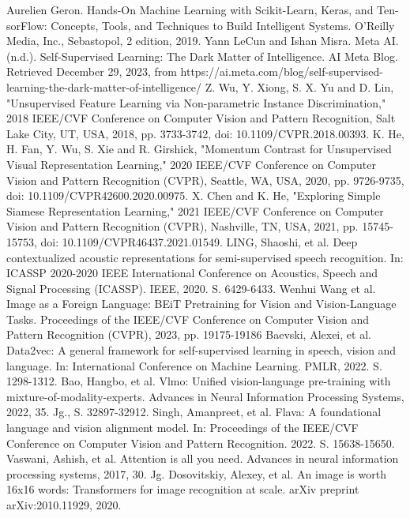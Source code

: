 \documentclass[fontsize=12pt,paper=a4,twoside=semi,parskip=half-,headsepline,headinclude]{scrreprt}
\begin{document}

\begin{thebibliography}{00}
   Aurelien Geron. Hands-On Machine Learning with Scikit-Learn, Keras, and Ten- sorFlow: Concepts, Tools, and Techniques to Build Intelligent Systems. O’Reilly Media, Inc., Sebastopol, 2 edition, 2019.
   Yann LeCun and Ishan Misra. Meta AI. (n.d.). Self-Supervised Learning: The Dark Matter of Intelligence. AI Meta Blog. Retrieved December 29, 2023, from https://ai.meta.com/blog/self-supervised-learning-the-dark-matter-of-intelligence/
   Z. Wu, Y. Xiong, S. X. Yu and D. Lin, "Unsupervised Feature Learning via Non-parametric Instance Discrimination," 2018 IEEE/CVF Conference on Computer Vision and Pattern Recognition, Salt Lake City, UT, USA, 2018, pp. 3733-3742, doi: 10.1109/CVPR.2018.00393.
   K. He, H. Fan, Y. Wu, S. Xie and R. Girshick, "Momentum Contrast for Unsupervised Visual Representation Learning," 2020 IEEE/CVF Conference on Computer Vision and Pattern Recognition (CVPR), Seattle, WA, USA, 2020, pp. 9726-9735, doi: 10.1109/CVPR42600.2020.00975.
   X. Chen and K. He, "Exploring Simple Siamese Representation Learning," 2021 IEEE/CVF Conference on Computer Vision and Pattern Recognition (CVPR), Nashville, TN, USA, 2021, pp. 15745-15753, doi: 10.1109/CVPR46437.2021.01549.
   LING, Shaoshi, et al. Deep contextualized acoustic representations for semi-supervised speech recognition. In: ICASSP 2020-2020 IEEE International Conference on Acoustics, Speech and Signal Processing (ICASSP). IEEE, 2020. S. 6429-6433.
   Wenhui Wang et al. Image as a Foreign Language: BEiT Pretraining for Vision and Vision-Language Tasks. Proceedings of the IEEE/CVF Conference on Computer Vision and Pattern Recognition (CVPR), 2023, pp. 19175-19186
   Baevski, Alexei, et al. Data2vec: A general framework for self-supervised learning in speech, vision and language. In: International Conference on Machine Learning. PMLR, 2022. S. 1298-1312.
   Bao, Hangbo, et al. Vlmo: Unified vision-language pre-training with mixture-of-modality-experts. Advances in Neural Information Processing Systems, 2022, 35. Jg., S. 32897-32912.
   Singh, Amanpreet, et al. Flava: A foundational language and vision alignment model. In: Proceedings of the IEEE/CVF Conference on Computer Vision and Pattern Recognition. 2022. S. 15638-15650.
   Vaswani, Ashish, et al. Attention is all you need. Advances in neural information processing systems, 2017, 30. Jg.
   Dosovitskiy, Alexey, et al. An image is worth 16x16 words: Transformers for image recognition at scale. arXiv preprint arXiv:2010.11929, 2020.
\end{thebibliography}
\end{document}
